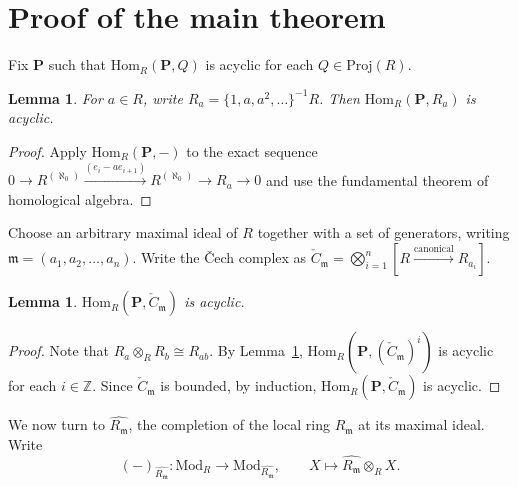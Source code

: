 \documentclass[11pt]{amsart}
\newtheorem{lemma}[theorem]{Lemma}
\theoremstyle{remark}
\begin{document}

\section{Proof of the main theorem}

Fix $\mathbf P$ such that $\mathrm{Hom}_R(\mathbf P, Q)$ is acyclic for each $Q \in \mathrm{Proj}(R)$.


\begin{lemma}\label{lem_Ra}
For $a \in R$, write $R_a = \{1,a,a^2, \ldots\}^{-1} R$. Then $\mathrm{Hom}_R(\mathbf P, R_a)$ is acyclic.
\end{lemma}

\begin{proof}
Apply $\mathrm{Hom}_R(\mathbf P, -)$ to the exact sequence $0 \to R^{(\aleph_0)} \xrightarrow{(e_i -ae_{i+1})} R^{(\aleph_0)} \to R_a \to 0$ and use the fundamental theorem of homological algebra.
\end{proof}

Choose an arbitrary maximal ideal of $R$ together with a set of generators, writing $\mathfrak m = (a_1, a_2,\ldots, a_n)$. Write the \v{C}ech complex as $\check C _\mathfrak m = \bigotimes_{i=1}^n [R \xrightarrow{\text{canonical}} R_{a_i}]$.

\begin{lemma}\label{lem_Cm}
$\mathrm{Hom}_R(\mathbf P, \check C_{\mathfrak m})$ is acyclic.
\end{lemma}

\begin{proof}
Note that $R_a \otimes _R R_b \cong R_{ab}$. By Lemma~\ref{lem_Ra}, $\mathrm{Hom}_R(\mathbf P, (\check C_{\mathfrak m})^{i})$ is acyclic for each $i\in \mathbb{Z}$. Since $\check C_{\mathfrak m}$ is bounded, by induction, $\mathrm{Hom}_R(\mathbf P, \check C_{\mathfrak m})$ is acyclic.
\end{proof}

We now turn to $\widehat{R_\mathfrak m}$, the completion of the local ring $R_\mathfrak m$ at its maximal ideal. Write
\begin{equation*}
(-)_{\widehat{R_\mathfrak m}} : \mathrm{Mod}_{R} \longrightarrow \mathrm{Mod}_{\widehat{R_\mathfrak m}}, \qquad X \longmapsto \widehat{R_\mathfrak m} \otimes _R X.
\end{equation*}
\end{document}
